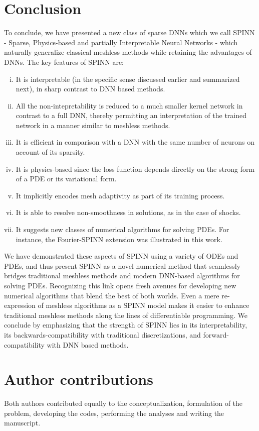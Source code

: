 \documentclass[12pt]{article}
\newcommand{\new}[1]{#1}
\newcommand{\rR}[1]{#1}
\begin{document}
\section{Conclusion}
To conclude, we have presented a new class of sparse DNNs which we call SPINN - Sparse, Physics-based and \rR{partially} Interpretable Neural Networks - which naturally generalize classical meshless methods while retaining the advantages of DNNs. The key features  of SPINN are:
\begin{enumerate}[(i)]
\item It is interpretable (\rR{in the specific sense discussed earlier and summarized next}), in sharp contrast to DNN based methods.
\item \rR{All the non-intepretability is reduced to a much smaller kernel network in contrast to a full DNN, thereby permitting an interpretation of the trained network in a manner similar to meshless methods.}
\item It is efficient in comparison with a DNN with the same number of neurons on account of its sparsity.
\item It is physics-based since the loss function depends directly on the strong form of a PDE or its variational form.
\item It implicitly encodes mesh adaptivity as part of its training process.
\item It is able to resolve non-smoothness in solutions, as in the case of shocks.
\item It suggests new classes of numerical algorithms for solving PDEs. For instance, the Fourier-SPINN extension was illustrated in this work.
\end{enumerate}
We have demonstrated these aspects of SPINN using a variety of ODEs and PDEs, and thus present SPINN as a novel numerical method that seamlessly bridges traditional meshless methods and modern DNN-based algorithms for solving PDEs.  Recognizing this link opens fresh avenues for developing new numerical algorithms that blend the best of both worlds. Even a mere re-expression of meshless algorithms as a SPINN model makes it easier to enhance traditional meshless methods along the lines of differentiable programming. \new{We conclude by emphasizing that the strength of SPINN lies in its interpretability, its backwards-compatibility with traditional discretizations, and forward-compatibility with DNN based methods.}


\section*{Author contributions}
Both authors contributed equally to the conceptualization, formulation of the problem, developing the codes, performing the analyses and writing the manuscript.
\end{document}
